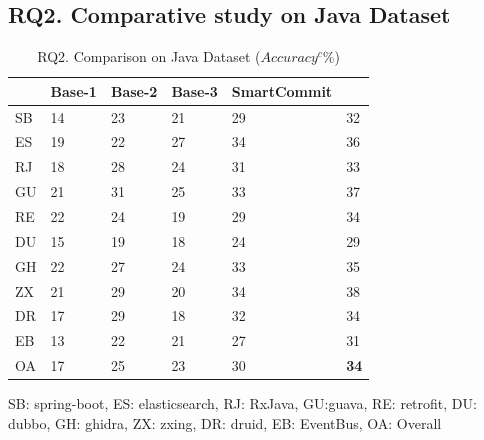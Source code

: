 \subsection{RQ2. Comparative study on Java Dataset}


\begin{table}[t]
	\caption{RQ2. Comparison on Java Dataset ($Accuracy^c$\%)}
	\vspace{-0.1in}
	\begin{center}
		\footnotesize
		\tabcolsep 4pt
		\renewcommand{\arraystretch}{1} \begin{tabular}{p{0.5cm}<{\centering}|p{1.2cm}<{\centering}|p{1.2cm}<{\centering}|p{1.2cm}<{\centering}|p{1.2cm}<{\centering}|p{1.2cm}<{\centering}}
			
			\hline
			          & Base-1 & Base-2  & Base-3 & SmartCommit & \bf {\tool}\\
			\hline
			SB   & 14 & 23 & 21 & 29 & 32\\
			ES   & 19 & 22 & 27 & 34 & 36\\
			RJ   & 18 & 28 & 24 & 31 & 33\\
			GU   & 21 & 31 & 25 & 33 & 37\\
			RE   & 22 & 24 & 19 & 29 & 34\\
			DU   & 15 & 19 & 18 & 24 & 29\\
			GH   & 22 & 27 & 24 & 33 & 35\\
			ZX   & 21 & 29 & 20 & 34 & 38\\
			DR   & 17 & 29 & 18 & 32 & 34\\
			EB   & 13 & 22 & 21 & 27 & 31\\
			\hline
			OA   &  17  & 25 &  23 & 30 & {\bf 34} \\
			\hline
		\end{tabular}
		\label{RQ2-result-1}
	SB: spring-boot, ES: elasticsearch, RJ: RxJava, GU:guava, RE: retrofit, DU: dubbo, GH: ghidra, ZX: zxing, DR: druid, EB: EventBus, OA: Overall
	\end{center}
\end{table}


